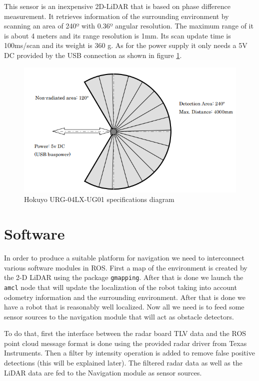This sensor is an inexpensive 2D-\ac{LiDAR} that is based on phase difference measurement. It retrieves information of the surrounding environment by scanning an area of 240º with 0.36º angular resolution. The maximum range of it is about 4 meters and its range resolution is 1mm. Its scan update time is 100ms/scan and its weight is 360 g.  As for the power supply it only needs a 5V DC provided by the USB connection as shown in figure \ref{fig::lidarS}.

\begin{figure}[ht!] 
\centerline{\includegraphics [width=0.6 \textwidth]{imgs/chapter4/lidarS.png}}
\caption{Hokuyo URG-04LX-UG01 specifications diagram}
\label{fig::lidarS}
\end{figure}

\section{Software}
In order to produce a suitable platform for navigation we need to interconnect various software modules in \ac{ROS}. First a map of the environment is created by the 2-D \ac{LiDAR} using the package \texttt{gmapping}. After that is done we launch the \texttt{amcl} node that will update the localization of the robot taking into account odometry information and the surrounding environment. After that is done we have a robot that is reasonably well localized. Now all we need is to feed some sensor sources to the navigation module that will act as obstacle detectors.

To do that, first the interface between the radar board TLV data and the ROS point cloud message format is done using the provided radar driver from Texas Instruments.  Then a filter by intensity operation is added to remove false positive detections (this will be explained later). The filtered radar data as well as the \ac{LiDAR} data are fed to the Navigation module as sensor sources.


